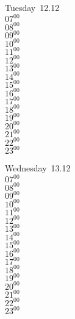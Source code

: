 \documentclass[11pt, a4paper]{book}\usepackage[]{graphicx}\usepackage[]{color}
\begin{document}
\begin{weekdaybox}
  Tuesday~12.12\\
  { 
  \vfill
  $07^{00}$\\
$08^{00}$\\
$09^{00}$\\
$10^{00}$\\
$11^{00}$\\
$12^{00}$\\
$13^{00}$\\
$14^{00}$\\
$15^{00}$\\
$16^{00}$\\
$17^{00}$\\
$18^{00}$\\
$19^{00}$\\
$20^{00}$\\
$21^{00}$\\
$22^{00}$\\
$23^{00}$\\
  }
\end{weekdaybox}
\begin{weekdaybox}
  Wednesday~13.12\\
  { 
  \vfill
  $07^{00}$\\
$08^{00}$\\
$09^{00}$\\
$10^{00}$\\
$11^{00}$\\
$12^{00}$\\
$13^{00}$\\
$14^{00}$\\
$15^{00}$\\
$16^{00}$\\
$17^{00}$\\
$18^{00}$\\
$19^{00}$\\
$20^{00}$\\
$21^{00}$\\
$22^{00}$\\
$23^{00}$\\
  }
\end{weekdaybox}
\clearpage
\begin{headerbox}
\end{headerbox}
\end{document}
